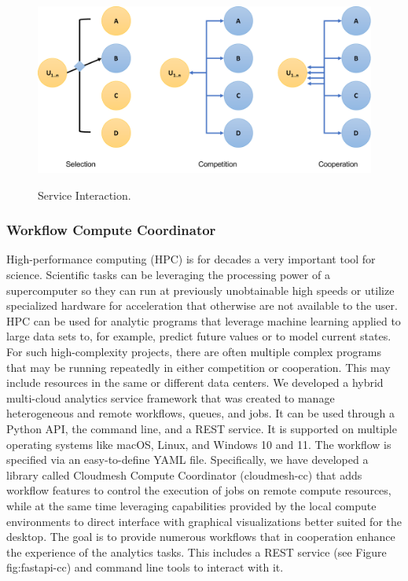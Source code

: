\documentclass[utf8]{FrontiersinVancouver} %
\begin{document}
\begin{figure}[htb]
\centering\includegraphics[width=0.75\columnwidth]{images/processes-nist.pdf}
\label{fig:service-interaction}
\caption{Service Interaction.}
\end{figure}




\subsubsection{Workflow Compute Coordinator}
\label{sec:workflow-cc}

High-performance computing (HPC) is for decades a very important tool
for science. Scientific tasks can be leveraging the processing power
of a supercomputer so they can run at previously unobtainable high
speeds or utilize specialized hardware for acceleration that otherwise
are not available to the user. HPC can be used for analytic programs
that leverage machine learning applied to large data sets to, for
example, predict future values or to model current states. For such
high-complexity projects, there are often multiple complex programs
that may be running repeatedly in either competition or cooperation.
This may include resources in the same or different data centers. We
developed a hybrid multi-cloud analytics service framework that was
created to manage heterogeneous and remote workflows, queues, and
jobs.  It can be used through a Python API, the command line, and a
REST service. It is supported on multiple operating systems like
macOS, Linux, and Windows 10 and 11.  The workflow is specified via an
easy-to-define YAML file.  Specifically, we have developed a library
called Cloudmesh Compute Coordinator (cloudmesh-cc)
\citep{las-22-arxiv-workflow-cc} that adds workflow features to
control the execution of jobs on remote compute resources, while at
the same time leveraging capabilities provided by the local compute
environments to direct interface with graphical visualizations better
suited for the desktop. The goal is to provide numerous workflows that
in cooperation enhance the experience of the analytics tasks. This
includes a REST service (see Figure {fig:fastapi-cc}) and command line
tools to interact with it.
\end{document}
